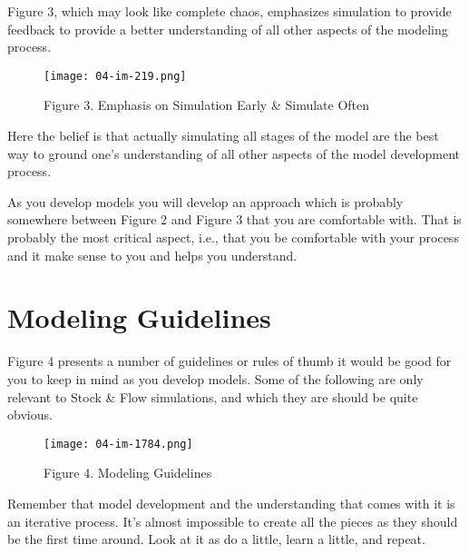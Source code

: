 \documentclass[]{memoir}
\let\Oldincludegraphics\includegraphics
\renewcommand{\includegraphics}[1]{\Oldincludegraphics[max size={\textwidth}{\textheight}]{#1}}
\begin{document}
Figure 3, which may look like complete chaos, emphasizes simulation to
provide feedback to provide a better understanding of all other aspects
of the modeling process.

\begin{figure}[htbp]
\centering
\texttt{[image: 04-im-219.png]}
\caption{Figure 3. Emphasis on Simulation Early \& Simulate Often}
\end{figure}

Here the belief is that actually simulating all stages of the model are
the best way to ground one's understanding of all other aspects of the
model development process.

As you develop models you will develop an approach which is probably
somewhere between Figure 2 and Figure 3 that you are comfortable with.
That is probably the most critical aspect, i.e., that you be comfortable
with your process and it make sense to you and helps you understand.

\section{Modeling Guidelines}

Figure 4 presents a number of guidelines or rules of thumb it would be
good for you to keep in mind as you develop models. Some of the
following are only relevant to Stock \& Flow simulations, and which they
are should be quite obvious.

\begin{figure}[htbp]
\centering
\texttt{[image: 04-im-1784.png]}
\caption{Figure 4. Modeling Guidelines}
\end{figure}

Remember that model development and the understanding that comes with it
is an iterative process. It's almost impossible to create all the pieces
as they should be the first time around. Look at it as do a little,
learn a little, and repeat.
\end{document}
